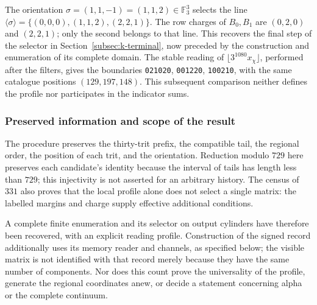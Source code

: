The orientation \(\sigma=(1,1,-1)=(1,1,2)\in\mathbb F_3^3\)
selects the line
\(\langle\sigma\rangle=\{(0,0,0),(1,1,2),(2,2,1)\}\).
The row charges of \(B_0,B_1\) are \((0,2,0)\) and \((2,2,1)\);
only the second belongs to that line. This recovers the final step
of the selector in Section~\ref{subsec:k-terminal}, now preceded by the
construction and enumeration of its complete domain. The stable reading
of \(\lfloor3^{1080}x_\chi\rfloor\), performed after the filters,
gives the boundaries \texttt{021020}, \texttt{001220}, \texttt{100210},
with the same catalogue positions \((129,197,148)\). This subsequent comparison
neither defines the profile nor participates in the indicator sums.

\subsubsection{Preserved information and scope of the result}

The procedure preserves the thirty-trit prefix, the compatible tail,
the regional order, the position of each trit, and the orientation. Reduction
modulo \(729\) here preserves each candidate's identity because the
interval of tails has length less than \(729\); this injectivity
is not asserted for an arbitrary history. The census of \(331\) also proves
that the local profile alone does not select a single matrix: the
labelled margins and charge supply effective additional conditions.

A complete finite enumeration and its selector on output cylinders have
therefore been recovered, with an explicit reading profile. Construction
of the signed record additionally uses its memory reader and channels,
as specified below; the visible matrix is not identified with that record
merely because they have the same number of components. Nor does this count
prove the universality of the profile, generate the regional coordinates anew,
or decide a statement concerning alpha or the complete continuum.
